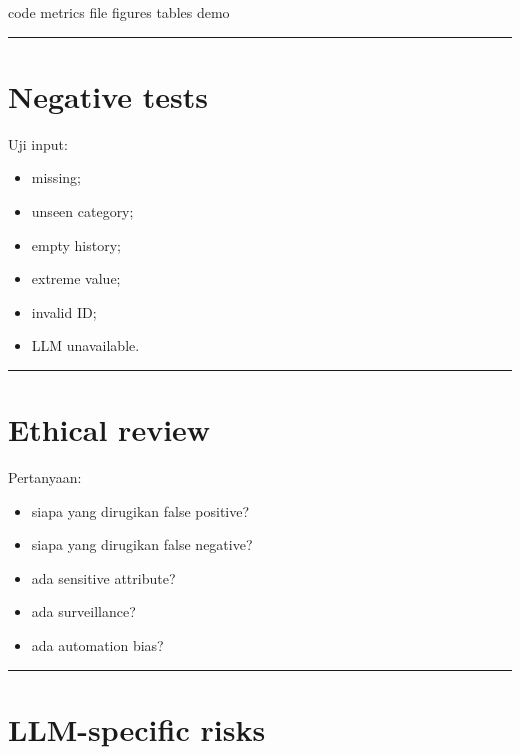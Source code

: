 \documentclass[
  indonesian,
  letterpaper,
  DIV=11,
  numbers=noendperiod]{scrreprt}
\newenvironment{Shaded}{\begin{snugshade}}{\end{snugshade}}
\newcommand{\NormalTok}[1]{\textcolor[rgb]{0.00,0.23,0.31}{#1}}
\providecommand{\tightlist}{%
  \setlength{\itemsep}{0pt}\setlength{\parskip}{0pt}}
\begin{document}
\begin{Shaded}
\begin{Highlighting}[]
\NormalTok{code}
\NormalTok{metrics file}
\NormalTok{figures}
\NormalTok{tables}
\NormalTok{demo}
\end{Highlighting}
\end{Shaded}

\begin{center}\rule{0.5\linewidth}{0.5pt}\end{center}

\section{Negative tests}\label{negative-tests}

Uji input:

\begin{itemize}
\tightlist
\item
  missing;
\item
  unseen category;
\item
  empty history;
\item
  extreme value;
\item
  invalid ID;
\item
  LLM unavailable.
\end{itemize}

\begin{center}\rule{0.5\linewidth}{0.5pt}\end{center}

\section{Ethical review}\label{ethical-review}

Pertanyaan:

\begin{itemize}
\tightlist
\item
  siapa yang dirugikan false positive?
\item
  siapa yang dirugikan false negative?
\item
  ada sensitive attribute?
\item
  ada surveillance?
\item
  ada automation bias?
\end{itemize}

\begin{center}\rule{0.5\linewidth}{0.5pt}\end{center}

\section{LLM-specific risks}\label{llm-specific-risks}
\end{document}

